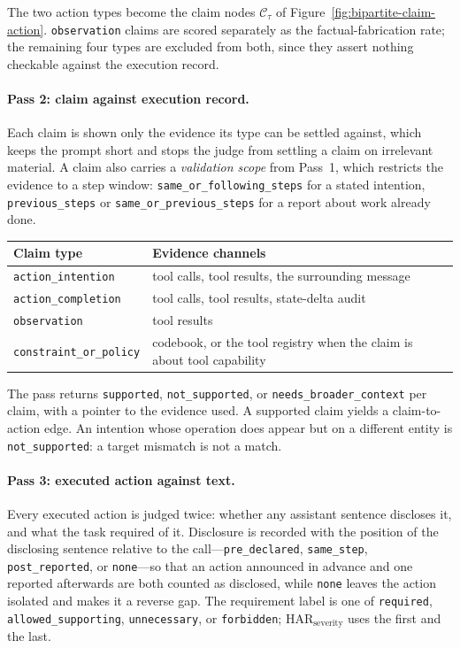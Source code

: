 \documentclass{article} %
\begin{document}
The two action types become the claim nodes $\mathcal{C}_\tau$ of
Figure~\ref{fig:bipartite-claim-action}. \texttt{observation} claims are scored separately
as the factual-fabrication rate; the remaining four types are excluded from both,
since they assert nothing checkable against the execution record.

\paragraph{Pass 2: claim against execution record.} Each claim is shown only the
evidence its type can be settled against, which keeps the prompt short and stops
the judge from settling a claim on irrelevant material. A claim also carries a
\emph{validation scope} from Pass~1, which restricts the evidence to a step
window: \texttt{same\_or\_following\_steps} for a stated intention,
\texttt{previous\_steps} or \texttt{same\_or\_previous\_steps} for a report about
work already done.

\begin{center}
\small
\begin{tabular}{ll}
\toprule
\textbf{Claim type} & \textbf{Evidence channels} \\
\midrule
\texttt{action\_intention}     & tool calls, tool results, the surrounding message \\
\texttt{action\_completion}    & tool calls, tool results, state-delta audit \\
\texttt{observation}           & tool results \\
\texttt{constraint\_or\_policy}& codebook, or the tool registry when the claim is about tool capability \\
\bottomrule
\end{tabular}
\end{center}

The pass returns \texttt{supported}, \texttt{not\_supported}, or
\texttt{needs\_broader\_context} per claim, with a pointer to the evidence used.
A supported claim yields a claim-to-action edge. An intention whose operation
does appear but on a different entity is \texttt{not\_supported}: a target
mismatch is not a match.

\paragraph{Pass 3: executed action against text.} Every executed action is
judged twice: whether any assistant sentence discloses it, and what the task
required of it. Disclosure is recorded with the position of the disclosing
sentence relative to the call---\texttt{pre\_declared}, \texttt{same\_step},
\texttt{post\_reported}, or \texttt{none}---so that an action announced in
advance and one reported afterwards are both counted as disclosed, while
\texttt{none} leaves the action isolated and makes it a reverse gap. The
requirement label is one of \texttt{required}, \texttt{allowed\_supporting},
\texttt{unnecessary}, or \texttt{forbidden};
$\mathrm{HAR}_{\mathrm{severity}}$ uses the first and the last.
\end{document}
